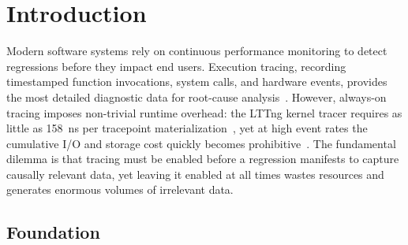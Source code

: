 \documentclass[pdflatex,sn-nature]{sn-jnl}
\theoremstyle{thmstyleone}%
\begin{document}

\maketitle

\section{Introduction}\label{sec:intro}

Modern software systems rely on continuous performance monitoring to detect
regressions before they impact end users.
Execution tracing, recording timestamped function invocations, system calls,
and hardware events, provides the most detailed diagnostic data for root-cause
analysis~\cite{cantrill2004dynamic,desnoyers2006lttng,rostedt2010ftrace}.
However, always-on tracing imposes non-trivial runtime overhead: the
LTTng kernel tracer requires as little as 158~ns per tracepoint
materialization~\cite{gebai-2018}, yet at high event rates the cumulative
I/O and storage cost quickly becomes prohibitive~\cite{arulraj2013production}.
The fundamental dilemma is that tracing must be enabled before a regression
manifests to capture causally relevant data, yet leaving it enabled at all
times wastes resources and generates enormous volumes of irrelevant data.

\subsection{Foundation}\label{sec:intro:conference}
\end{document}
